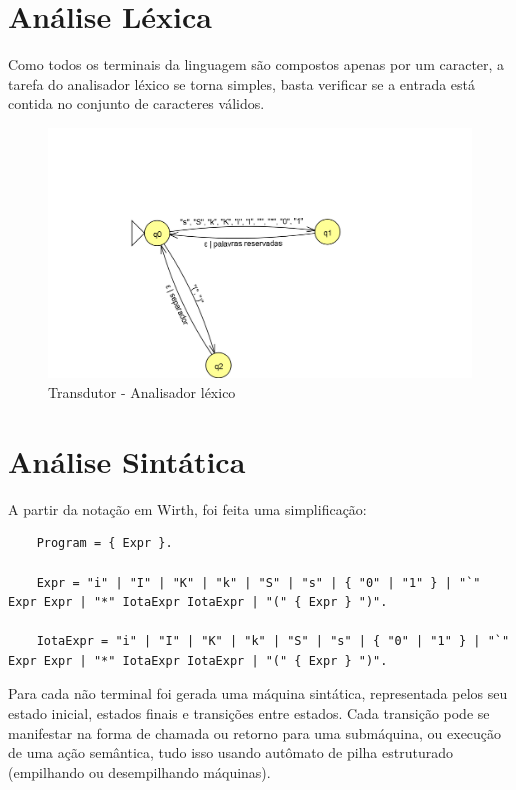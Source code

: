 \section{Análise Léxica}

Como todos os terminais da linguagem são compostos apenas por um caracter, a tarefa do analisador léxico se torna simples, basta verificar se a entrada está contida no conjunto de caracteres válidos.

\begin{figure}[H]
\centering
\includegraphics[width=14cm,keepaspectratio]{jflap-automatas/lexico.png}
\caption{\label{fig:jflap-lexico} Transdutor - Analisador léxico}
\end{figure}

\section{Análise Sintática}

A partir da notação em Wirth, foi feita uma simplificação:

\begin{lstlisting}
    Program = { Expr }.

    Expr = "i" | "I" | "K" | "k" | "S" | "s" | { "0" | "1" } | "`" Expr Expr | "*" IotaExpr IotaExpr | "(" { Expr } ")".
    
    IotaExpr = "i" | "I" | "K" | "k" | "S" | "s" | { "0" | "1" } | "`" Expr Expr | "*" IotaExpr IotaExpr | "(" { Expr } ")".
\end{lstlisting}

Para cada não terminal foi gerada uma máquina sintática, representada pelos seu estado inicial, estados finais e  transições entre estados. Cada transição pode se manifestar na forma de chamada ou retorno para uma submáquina, ou execução de uma ação semântica, tudo isso usando autômato de pilha estruturado (empilhando ou desempilhando máquinas).

